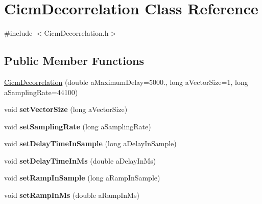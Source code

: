 \hypertarget{class_cicm_decorrelation}{\section{Cicm\-Decorrelation Class Reference}
\label{class_cicm_decorrelation}
}


{\ttfamily \#include $<$Cicm\-Decorrelation.\-h$>$}

\subsection*{Public Member Functions}
\begin{DoxyCompactItemize}
\item 
\hyperlink{class_cicm_decorrelation_adafae7e2fc7a93b7364bbd1b261e6951}{Cicm\-Decorrelation} (double a\-Maximum\-Delay=5000., long a\-Vector\-Size=1, long a\-Sampling\-Rate=44100)
\item 
\hypertarget{class_cicm_decorrelation_a507597110d367005817c5168d3e84b10}{void {\bfseries set\-Vector\-Size} (long a\-Vector\-Size)}\label{class_cicm_decorrelation_a507597110d367005817c5168d3e84b10}

\item 
\hypertarget{class_cicm_decorrelation_ababded5f3fced5329a4e898791d07a3f}{void {\bfseries set\-Sampling\-Rate} (long a\-Sampling\-Rate)}\label{class_cicm_decorrelation_ababded5f3fced5329a4e898791d07a3f}

\item 
\hypertarget{class_cicm_decorrelation_a0a6f0e743aabbf7cbf2c48003f6af98c}{void {\bfseries set\-Delay\-Time\-In\-Sample} (long a\-Delay\-In\-Sample)}\label{class_cicm_decorrelation_a0a6f0e743aabbf7cbf2c48003f6af98c}

\item 
\hypertarget{class_cicm_decorrelation_a3d031fd3db9bc382d5c8cc873ef8fa1b}{void {\bfseries set\-Delay\-Time\-In\-Ms} (double a\-Delay\-In\-Ms)}\label{class_cicm_decorrelation_a3d031fd3db9bc382d5c8cc873ef8fa1b}

\item 
\hypertarget{class_cicm_decorrelation_a21270d01be9d010718e382f425db5071}{void {\bfseries set\-Ramp\-In\-Sample} (long a\-Ramp\-In\-Sample)}\label{class_cicm_decorrelation_a21270d01be9d010718e382f425db5071}

\item 
\hypertarget{class_cicm_decorrelation_a5d3ba4a649099851d55c800f1908a5e1}{void {\bfseries set\-Ramp\-In\-Ms} (double a\-Ramp\-In\-Ms)}\label{class_cicm_decorrelation_a5d3ba4a649099851d55c800f1908a5e1}


\end{DoxyCompactItemize}

